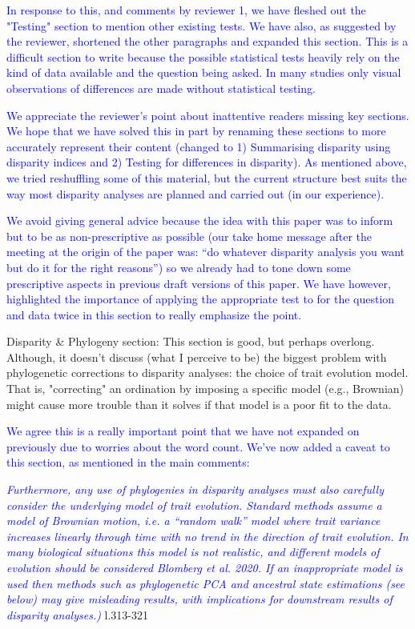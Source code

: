 \documentclass[12pt,letterpaper]{article}
\begin{document}
\textcolor{blue}{In response to this, and comments by reviewer 1, we have fleshed out the "Testing" section to mention other existing tests. We have also, as suggested by the reviewer, shortened the other paragraphs and expanded this section. This is a difficult section to write because the possible statistical tests heavily rely on the kind of data available and the question being asked. In many studies only visual observations of differences are made without statistical testing.}

\textcolor{blue}{We appreciate the reviewer's point about inattentive readers missing key sections. We hope that we have solved this in part by renaming these sections to more accurately represent their content (changed to 1) Summarising disparity using disparity indices and 2) Testing for differences in disparity). As mentioned above, we tried reshuffling some of this material, but the current structure best suits the way most disparity analyses are planned and carried out (in our experience).} 

\textcolor{blue}{We avoid giving general advice because the idea with this paper was to inform but to be as non-prescriptive as possible (our take home message after the meeting at the origin of the paper was: ``do whatever disparity analysis you want but do it for the right reasons'') so we already had to tone down some prescriptive aspects in previous draft versions of this paper. We have however, highlighted the importance of applying the appropriate test to for the question and data twice in this section to really emphasize the point.}

\noindent Disparity \& Phylogeny section: This section is good, but perhaps overlong. Although, it doesn't discuss (what I perceive to be) the biggest problem with phylogenetic corrections to disparity analyses: the choice of trait evolution model.
That is, "correcting" an ordination by imposing a specific model (e.g., Brownian) might cause more trouble than it solves if that model is a poor fit to the data.

\textcolor{blue}{We agree this is a really important point that we have not expanded on previously due to worries about the word count. We've now added a caveat to this section, as mentioned in the main comments:}

\textcolor{blue}{\textit{Furthermore, any use of phylogenies in disparity analyses must also carefully consider the underlying model of trait evolution. Standard methods assume a model of Brownian motion, i.e. a ``random walk'' model where trait variance increases linearly through time with no trend in the direction of trait evolution. In many biological situations this model is not realistic, and different models of evolution should be considered Blomberg et al. 2020. If an inappropriate model is used then methods such as phylogenetic PCA and ancestral state estimations (see below) may give misleading results, with implications for downstream results of disparity analyses.)}} l.313-321 %
\end{document}

